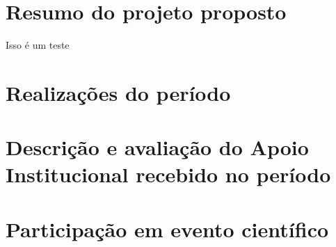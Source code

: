 \documentclass[12pt]{report}
\begin{document}
%
%
\geraTitulo
%
\folhaDeRosto
%
%
%
\tableofcontents
\clearpage
%

\sectionfont{\scshape}

\chapter{Resumo do projeto proposto}\label{chp:resumoProj} 
Isso é um teste \cite{Gradvohl2014}

\chapter{Realizações do período}\label{chp:realizacoes}


\chapter{Descrição e avaliação do Apoio Institucional recebido no período}\label{chp:apoioInst}

\chapter{Participação em evento científico}\label{chp:particEvento}





\end{document}
